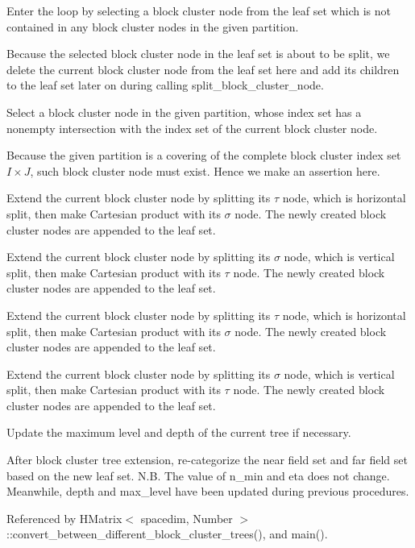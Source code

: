 Enter the loop by selecting a block cluster node from the leaf set which is not contained in any block cluster nodes in the given partition.

Because the selected block cluster node in the leaf set is about to be split, we delete the current block cluster node from the leaf set here and add its children to the leaf set later on during calling {\ttfamily split\+\_\+block\+\_\+cluster\+\_\+node}.

Select a block cluster node in the given partition, whose index set has a nonempty intersection with the index set of the current block cluster node.

Because the given partition is a covering of the complete block cluster index set $I \times J$, such block cluster node must exist. Hence we make an assertion here.

Extend the current block cluster node by splitting its $\tau$ node, which is horizontal split, then make Cartesian product with its $\sigma$ node. The newly created block cluster nodes are appended to the leaf set.

Extend the current block cluster node by splitting its $\sigma$ node, which is vertical split, then make Cartesian product with its $\tau$ node. The newly created block cluster nodes are appended to the leaf set.

Extend the current block cluster node by splitting its $\tau$ node, which is horizontal split, then make Cartesian product with its $\sigma$ node. The newly created block cluster nodes are appended to the leaf set.

Extend the current block cluster node by splitting its $\sigma$ node, which is vertical split, then make Cartesian product with its $\tau$ node. The newly created block cluster nodes are appended to the leaf set.

Update the maximum level and depth of the current tree if necessary.

After block cluster tree extension, re-\/categorize the near field set and far field set based on the new leaf set. N.\+B. The value of {\ttfamily n\+\_\+min} and {\ttfamily eta} does not change. Meanwhile, {\ttfamily depth} and {\ttfamily max\+\_\+level} have been updated during previous procedures.

Referenced by H\+Matrix$<$ spacedim, Number $>$\+::convert\+\_\+between\+\_\+different\+\_\+block\+\_\+cluster\+\_\+trees(), and main().

\mbox{\label{classBlockClusterTree_adfe18d32a3c05a9209a5cdc9270b47d7}} 
